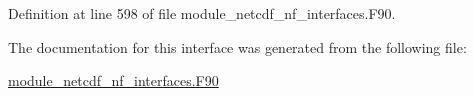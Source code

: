 Definition at line 598 of file module\+\_\+netcdf\+\_\+nf\+\_\+interfaces.\+F90.



The documentation for this interface was generated from the following file\+:\begin{DoxyCompactItemize}
\item 
\hyperlink{module__netcdf__nf__interfaces_8F90}{module\+\_\+netcdf\+\_\+nf\+\_\+interfaces.\+F90}\end{DoxyCompactItemize}
